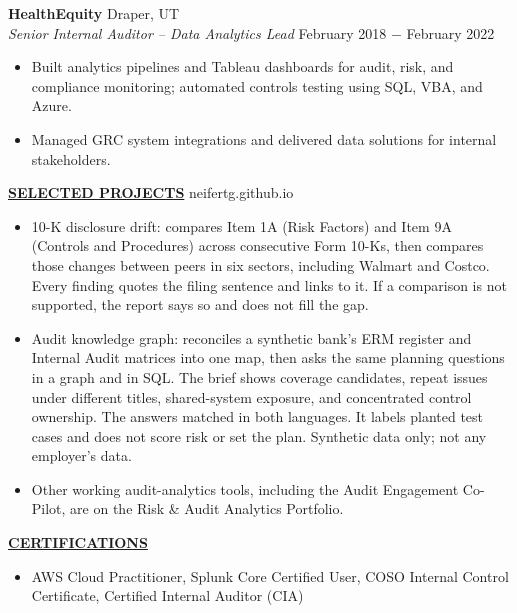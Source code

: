 \documentclass{article}
\begin{document}
\noindent \textbf{HealthEquity} \hfill Draper, UT \\
\textit{Senior Internal Auditor -- Data Analytics Lead} \hfill February 2018 $-$ February 2022
\\
\begin{itemize}[noitemsep,nolistsep,leftmargin=*]
\item {Built analytics pipelines and Tableau dashboards for audit, risk, and compliance monitoring; automated controls testing using SQL, VBA, and Azure.}
\item {Managed GRC system integrations and delivered data solutions for internal stakeholders.}
\\
\end{itemize}

\noindent \textbf{\underline{SELECTED PROJECTS}} \hfill neifertg.github.io \\
\begin{itemize}[noitemsep,nolistsep,leftmargin=*]
\item {10-K disclosure drift: compares Item 1A (Risk Factors) and Item 9A (Controls and Procedures) across consecutive Form 10-Ks, then compares those changes between peers in six sectors, including Walmart and Costco. Every finding quotes the filing sentence and links to it. If a comparison is not supported, the report says so and does not fill the gap.}
\item {Audit knowledge graph: reconciles a synthetic bank's ERM register and Internal Audit matrices into one map, then asks the same planning questions in a graph and in SQL. The brief shows coverage candidates, repeat issues under different titles, shared-system exposure, and concentrated control ownership. The answers matched in both languages. It labels planted test cases and does not score risk or set the plan. Synthetic data only; not any employer's data.}
\item {Other working audit-analytics tools, including the Audit Engagement Co-Pilot, are on the Risk \& Audit Analytics Portfolio.}
\\
\end{itemize}

\noindent \textbf{\underline{CERTIFICATIONS}}
\begin{itemize}[noitemsep,nolistsep,leftmargin=*]
\item {AWS Cloud Practitioner, Splunk Core Certified User, COSO Internal Control Certificate, Certified Internal Auditor (CIA)}
\\
\end{itemize}
\end{document}
